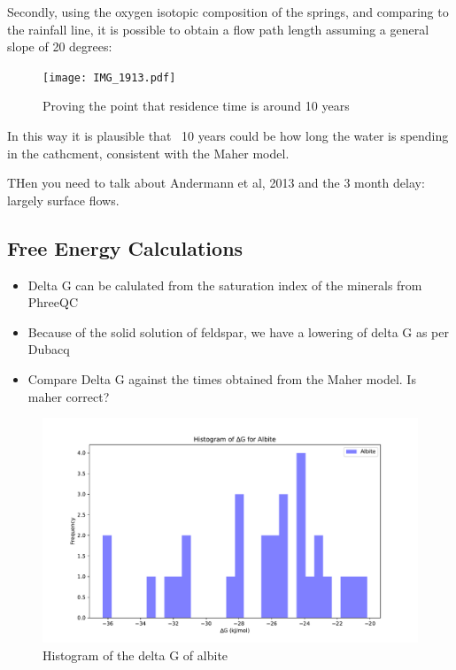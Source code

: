 \bsk

Secondly, using the oxygen isotopic composition of the springs, and comparing to the rainfall line, it is possible to obtain a flow path length assuming a general slope of 20 degrees:



\begin{figure}[h]
    \centering
    \texttt{[image: IMG\_1913.pdf]}
    \caption{Proving the point that residence time is around 10 years}
    \label{fig:discussion7}
\end{figure}

\FloatBarrier




In this way it is plausible that ~10 years could be how long the water is spending in the cathcment, consistent with the Maher model.

THen you need to talk about Andermann et al, 2013 and the 3 month delay: largely surface flows.




\subsection{Free Energy Calculations}

\begin{itemize}
    \item Delta G can be calulated from the saturation index of the minerals from PhreeQC
    \item Because of the solid solution of feldspar, we have a lowering of delta G as per Dubacq
    \item Compare Delta G against the times obtained from the Maher model. Is maher correct?

\end{itemize}

\begin{figure}[h]
    \centering
    \includegraphics[width=\textwidth]{Albite_histogram.pdf}
    \caption{Histogram of the delta G of albite}
    \label{fig:discussion8}
\end{figure}


